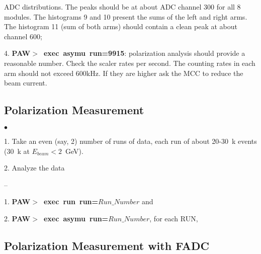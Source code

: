 {\begin{list}{}{\setlength{\itemsep}{0.5cm}}
\begin{list}{}{\setlength{\itemsep}{0.cm}}
                       ADC distributions. The peaks should be at about ADC channel 300
                       for all 8 modules. The histograms 9 and 10 present the sums
                       of the left and right arms.
                       The histogram 11 (sum of both arms) should contain a clean peak at
                       about channel 600;
             \item[4.] {\bf PAW$>$~exec~asymu~run=9915}: polarization analysis should
                       provide a reasonable number. Check the scaler rates per second.
                       The counting rates in each arm should not exceed 600kHz. If they
                       are higher ask the MCC to reduce the beam current.
        \end{list}
\end{list}
\subsection {Polarization Measurement }
\label{sec:polmeas}
\vspace{-\parskip}

\begin{list}{$\bullet$}{\setlength{\itemsep}{0.cm}}
  \item[1.] Take an even (say, 2) number  of runs of data, each run of about 20-30~k
            events (30~k at $E_{beam}<2$~GeV).
  \item[2.] Analyze the data
\vspace{-\parskip}
        \begin{list}{--}{\setlength{\itemsep}{0.cm}}
             \item[1.] {\bf PAW$>$~exec~run~run=$Run\_Number$} and
             \item[2.] {\bf PAW$>$~exec~asymu~run=$Run\_Number$}, for each RUN,
        \end{list}
\end{list}
\subsection {Polarization Measurement with FADC}
\label{sec:polmeas_fadc}
\vspace{-\parskip}

}
